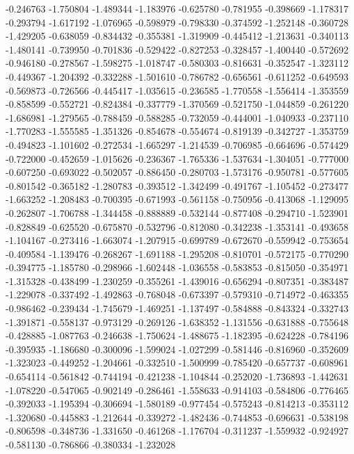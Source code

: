 -0.246763
-1.750804
-1.489344
-1.183976
-0.625780
-0.781955
-0.398669
-1.178317
-0.293794
-1.617192
-1.076965
-0.598979
-0.798330
-0.374592
-1.252148
-0.360728
-1.429205
-0.638059
-0.834432
-0.355381
-1.319909
-0.445412
-1.213631
-0.340113
-1.480141
-0.739950
-0.701836
-0.529422
-0.827253
-0.328457
-1.400440
-0.572692
-0.946180
-0.278567
-1.598275
-1.018747
-0.580303
-0.816631
-0.352547
-1.323112
-0.449367
-1.204392
-0.332288
-1.501610
-0.786782
-0.656561
-0.611252
-0.649593
-0.569873
-0.726566
-0.445417
-1.035615
-0.236585
-1.770558
-1.556414
-1.353559
-0.858599
-0.552721
-0.824384
-0.337779
-1.370569
-0.521750
-1.044859
-0.261220
-1.686981
-1.279565
-0.788459
-0.588285
-0.732059
-0.444001
-1.040933
-0.237110
-1.770283
-1.555585
-1.351326
-0.854678
-0.554674
-0.819139
-0.342727
-1.353759
-0.494823
-1.101602
-0.272534
-1.665297
-1.214539
-0.706985
-0.664696
-0.574429
-0.722000
-0.452659
-1.015626
-0.236367
-1.765336
-1.537634
-1.304051
-0.777000
-0.607250
-0.693022
-0.502057
-0.886450
-0.280703
-1.573176
-0.950781
-0.577605
-0.801542
-0.365182
-1.280783
-0.393512
-1.342499
-0.491767
-1.105452
-0.273477
-1.663252
-1.208483
-0.700395
-0.671993
-0.561158
-0.750956
-0.413068
-1.129095
-0.262807
-1.706788
-1.344458
-0.888889
-0.532144
-0.877408
-0.294710
-1.523901
-0.828849
-0.625520
-0.675870
-0.532796
-0.812080
-0.342238
-1.353141
-0.493658
-1.104167
-0.273416
-1.663074
-1.207915
-0.699789
-0.672670
-0.559942
-0.753654
-0.409584
-1.139476
-0.268267
-1.691188
-1.295208
-0.810701
-0.572175
-0.770290
-0.394775
-1.185780
-0.298966
-1.602448
-1.036558
-0.583853
-0.815050
-0.354971
-1.315328
-0.438499
-1.230259
-0.355261
-1.439016
-0.656294
-0.807351
-0.383487
-1.229078
-0.337492
-1.492863
-0.768048
-0.673397
-0.579310
-0.714972
-0.463355
-0.986462
-0.239434
-1.745679
-1.469251
-1.137497
-0.584888
-0.843324
-0.332743
-1.391871
-0.558137
-0.973129
-0.269126
-1.638352
-1.131556
-0.631888
-0.755648
-0.428885
-1.087763
-0.246638
-1.750624
-1.488675
-1.182395
-0.624228
-0.784196
-0.395935
-1.186680
-0.300096
-1.599024
-1.027299
-0.581446
-0.816960
-0.352609
-1.323023
-0.449252
-1.204661
-0.332510
-1.500999
-0.785420
-0.657737
-0.608961
-0.654114
-0.561842
-0.744194
-0.421238
-1.104844
-0.252020
-1.736893
-1.442631
-1.078220
-0.547065
-0.902149
-0.286461
-1.558633
-0.914103
-0.584806
-0.776465
-0.392033
-1.195394
-0.306694
-1.580189
-0.977454
-0.575243
-0.814213
-0.353112
-1.320680
-0.445883
-1.212644
-0.339272
-1.482436
-0.744853
-0.696631
-0.538198
-0.806598
-0.348736
-1.331650
-0.461268
-1.176704
-0.311237
-1.559932
-0.924927
-0.581130
-0.786866
-0.380334
-1.232028
